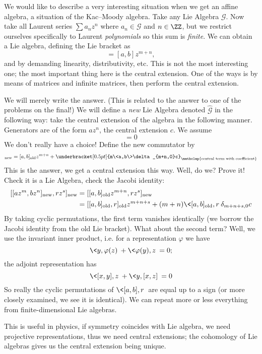 We would like to describe a very interesting situation when we
get an affine algebra, a situation of the Kac--Moody algebra. Take
any Lie Algebra $\mathscr{G}$. Now take all Laurent series $\sum
a_{n}z^{n}$ where $a_{n}\in\mathscr{G}$ and $n\in\ZZ$, but we
restrict ourselves specifically to Laurent \emph{polynomials} so
this sum is \emph{finite}. We can obtain a Lie algebra, defining
the Lie bracket as
\begin{equation}
[az^{m},bz^{n}] = [a,b]z^{m+n},
\end{equation}
and by demanding linearity, distributivity, etc. This is not the
most interesting one; the most important thing here is the
central extension. One of the ways is by means of matrices and
infinite matrices, then perform the central extension.

We will merely write the answer. (This is related to the answer
to one of the problems on the final!) We will define a \emph{new}
Lie Algebra denoted $\widehat{\mathscr{G}}$ in the following way:
take the central extension of the algebra in the following
manner. Generators are of the form $az^{n}$, the central
extension $c$. We assume
\begin{equation}
[az^{n},c] = 0
\end{equation}
We don't really have a choice! Define the new commutator by
\begin{equation}
[az^{m},bz^{n}]_{\text{new}}=[a,b]_{\text{old}}z^{m+n}+\underbracket[0.5pt]{m\<a,b\>\delta_{m+n,0}c}_{\mathclap{\text{central term with coefficient}}}
\end{equation}
This is the answer, we get a central extension this way. Well, do
we? Prove it! Check it is a Lie Algebra, check the Jacobi
identity:
\begin{subequations}
\begin{align}
[[az^{m},bz^{n}]_{\text{new}},rz^{s}]_{\text{new}} &=[[a,b]_{\text{old}}z^{m+n},rz^{s}]_{\text{new}}\\
&=[[a,b]_{\text{old}},r]_{\text{old}}z^{m+n+s} +
(m+n)\<[a,b]_{\text{old}},r\>\delta_{m+n+s,0}c
\end{align}
\end{subequations}
By taking cyclic permutations, the first term vanishes
identically (we borrow the Jacobi identity from the old Lie
bracket). What about the second term? Well, we use the invariant
inner product, i.e. for a representation $\varphi$ we have
\begin{equation}
\<y,\varphi(z)\>+\<\varphi(y),z\> = 0;
\end{equation}
the adjoint representation has
\begin{equation}
\<[x,y],z\>+\<y,[x,z]\> = 0
\end{equation}
So really the cyclic permutations of $\<[a,b],r\>$ are equal up
to a sign (or more closely examined, we see it is identical). We
can repeat more or less everything from finite-dimensional Lie
algebras.

\begin{rmk}
This is useful in physics, if symmetry coincides with Lie
algebra, we need projective representations, thus we need central
extensions; the cohomology of Lie algebras gives us the central
extension being unique.
\end{rmk}
